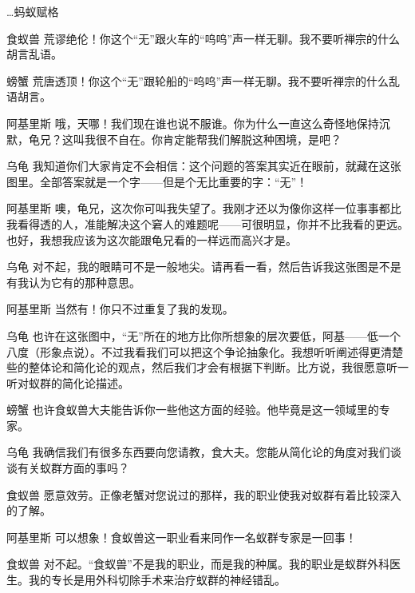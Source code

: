 \begin{dialog}{…蚂蚁赋格}
\begin{dialogue}
\item[食蚁兽]荒谬绝伦！你这个“无”跟火车的“呜呜”声一样无聊。我不要听禅宗的什么胡言乱语。

\item[螃蟹]荒唐透顶！你这个“无”跟轮船的“呜呜”声一样无聊。我不要听禅宗的什么乱语胡言。

\item[阿基里斯]哦，天哪！我们现在谁也说不服谁。你为什么一直这么奇怪地保持沉默，龟兄？这叫我很不自在。你肯定能帮我们解脱这种困境，是吧？

\item[乌龟]我知道你们大家肯定不会相信：这个问题的答案其实近在眼前，就藏在这张图里。全部答案就是一个字——但是个无比重要的字：“无”！


\item[阿基里斯]噢，龟兄，这次你可叫我失望了。我刚才还以为像你这样一位事事都比我看得透的人，准能解决这个窘人的难题呢——可很明显，你并不比我看的更远。也好，我想我应该为这次能跟龟兄看的一样远而高兴才是。

\item[乌龟]对不起，我的眼睛可不是一般地尖。请再看一看，然后告诉我这张图是不是有我认为它有的那种意思。

\item[阿基里斯]当然有！你只不过重复了我的发现。

\item[乌龟]也许在这张图中，“无”所在的地方比你所想象的层次要低，阿基——低一个八度（形象点说）。不过我看我们可以把这个争论抽象化。我想听听阐述得更清楚些的整体论和简化论的观点，然后我们才会有根据下判断。比方说，我很愿意听一听对蚁群的简化论描述。

\item[螃蟹]也许食蚁兽大夫能告诉你一些他这方面的经验。他毕竟是这一领域里的专家。

\item[乌龟]我确信我们有很多东西要向您请教，食大夫。您能从简化论的角度对我们谈谈有关蚁群方面的事吗？

\item[食蚁兽]愿意效劳。正像老蟹对您说过的那样，我的职业使我对蚁群有着比较深入的了解。

\item[阿基里斯]可以想象！食蚁兽这一职业看来同作一名蚁群专家是一回事！

\item[食蚁兽]对不起。“食蚁兽”不是我的职业，而是我的种属。我的职业是蚁群外科医生。我的专长是用外科切除手术来治疗蚁群的神经错乱。


\end{dialogue}
\end{dialog}

